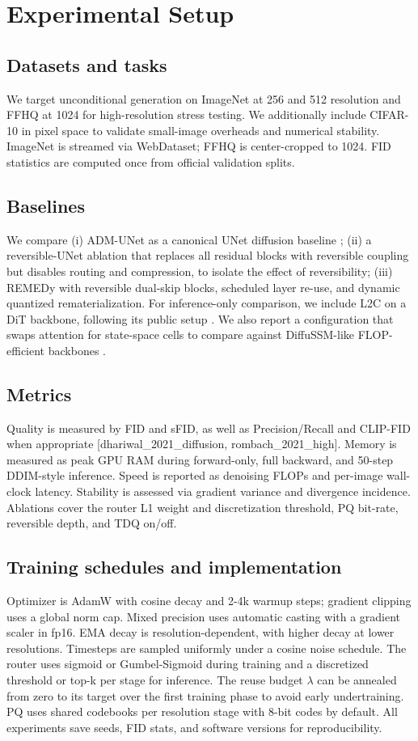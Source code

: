\documentclass{article}
\begin{document}
\section{Experimental Setup}
\subsection{Datasets and tasks}
We target unconditional generation on ImageNet at 256 and 512 resolution and FFHQ at 1024 for high-resolution stress testing. We additionally include CIFAR-10 in pixel space to validate small-image overheads and numerical stability. ImageNet is streamed via WebDataset; FFHQ is center-cropped to 1024. FID statistics are computed once from official validation splits.

\subsection{Baselines}
We compare (i) ADM-UNet as a canonical UNet diffusion baseline \cite{dhariwal_2021_diffusion}; (ii) a reversible-UNet ablation that replaces all residual blocks with reversible coupling but disables routing and compression, to isolate the effect of reversibility; (iii) REMEDy with reversible dual-skip blocks, scheduled layer re-use, and dynamic quantized rematerialization. For inference-only comparison, we include L2C on a DiT backbone, following its public setup \cite{ma_2024_learning}. We also report a configuration that swaps attention for state-space cells to compare against DiffuSSM-like FLOP-efficient backbones \cite{yan_2023_diffusion}.

\subsection{Metrics}
Quality is measured by FID and sFID, as well as Precision/Recall and CLIP-FID when appropriate [dhariwal_2021_diffusion, rombach_2021_high]. Memory is measured as peak GPU RAM during forward-only, full backward, and 50-step DDIM-style inference. Speed is reported as denoising FLOPs and per-image wall-clock latency. Stability is assessed via gradient variance and divergence incidence. Ablations cover the router L1 weight and discretization threshold, PQ bit-rate, reversible depth, and TDQ on/off.

\subsection{Training schedules and implementation}
Optimizer is AdamW with cosine decay and 2-4k warmup steps; gradient clipping uses a global norm cap. Mixed precision uses automatic casting with a gradient scaler in fp16. EMA decay is resolution-dependent, with higher decay at lower resolutions. Timesteps are sampled uniformly under a cosine noise schedule. The router uses sigmoid or Gumbel-Sigmoid during training and a discretized threshold or top-k per stage for inference. The reuse budget $\lambda$ can be annealed from zero to its target over the first training phase to avoid early undertraining. PQ uses shared codebooks per resolution stage with 8-bit codes by default. All experiments save seeds, FID stats, and software versions for reproducibility.
\end{document}
